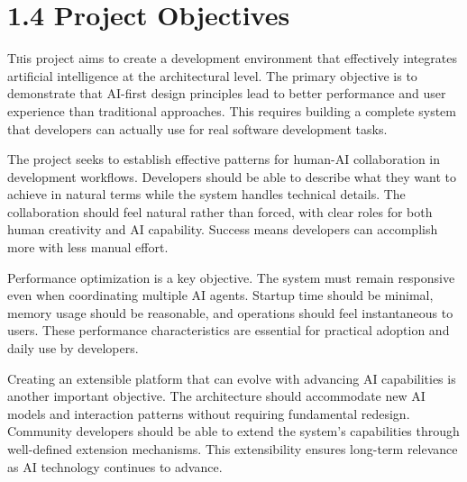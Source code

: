 \clearpage
\section{1.4 Project Objectives}
\label{sec:objectives}

\lettrine{T}his project aims to create a development environment that effectively integrates artificial intelligence at the architectural level. The primary objective is to demonstrate that AI-first design principles lead to better performance and user experience than traditional approaches. This requires building a complete system that developers can actually use for real software development tasks.

The project seeks to establish effective patterns for human-AI collaboration in development workflows. Developers should be able to describe what they want to achieve in natural terms while the system handles technical details. The collaboration should feel natural rather than forced, with clear roles for both human creativity and AI capability. Success means developers can accomplish more with less manual effort.

Performance optimization is a key objective. The system must remain responsive even when coordinating multiple AI agents. Startup time should be minimal, memory usage should be reasonable, and operations should feel instantaneous to users. These performance characteristics are essential for practical adoption and daily use by developers.

Creating an extensible platform that can evolve with advancing AI capabilities is another important objective. The architecture should accommodate new AI models and interaction patterns without requiring fundamental redesign. Community developers should be able to extend the system's capabilities through well-defined extension mechanisms. This extensibility ensures long-term relevance as AI technology continues to advance.
